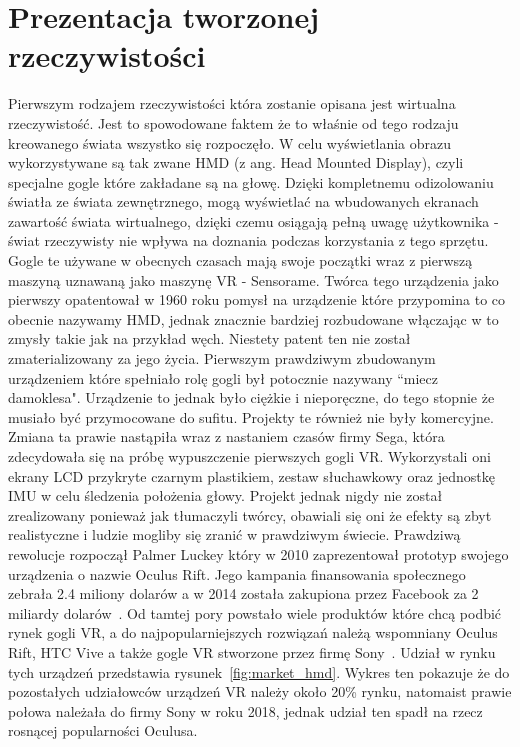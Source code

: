 \section{Prezentacja tworzonej rzeczywistości}
\label{sec:okulary}
	Pierwszym rodzajem rzeczywistości która zostanie opisana jest wirtualna rzeczywistość. Jest to spowodowane faktem że to właśnie od tego rodzaju kreowanego świata wszystko się rozpoczęło. W celu wyświetlania obrazu wykorzystywane są tak zwane HMD (z ang. Head Mounted Display), czyli specjalne gogle które zakładane są na głowę. Dzięki kompletnemu odizolowaniu światła ze świata zewnętrznego, mogą wyświetlać na wbudowanych ekranach zawartość świata wirtualnego, dzięki czemu osiągają pełną uwagę użytkownika - świat rzeczywisty nie wpływa na doznania podczas korzystania z tego sprzętu. Gogle te używane w obecnych czasach mają swoje początki wraz z pierwszą maszyną uznawaną jako maszynę VR - Sensorame. Twórca tego urządzenia jako pierwszy opatentował w 1960 roku pomysł na urządzenie które przypomina to co obecnie nazywamy HMD, jednak znacznie bardziej rozbudowane włączając w to zmysły takie jak na przykład węch. Niestety patent ten nie został zmaterializowany za jego życia. Pierwszym prawdziwym zbudowanym urządzeniem które spełniało rolę gogli był potocznie nazywany ``miecz damoklesa". Urządzenie to jednak było ciężkie i nieporęczne, do tego stopnie że musiało być przymocowane do sufitu. Projekty te również nie były komercyjne. Zmiana ta prawie nastąpiła wraz z nastaniem czasów firmy Sega, która zdecydowała się na próbę wypuszczenie pierwszych gogli VR. Wykorzystali oni ekrany LCD przykryte czarnym plastikiem, zestaw słuchawkowy oraz jednostkę IMU w celu śledzenia położenia głowy. Projekt jednak nigdy nie został zrealizowany ponieważ jak tłumaczyli twórcy, obawiali się oni że efekty są zbyt realistyczne i ludzie mogliby się zranić w prawdziwym świecie. Prawdziwą rewolucje rozpoczął Palmer Luckey który w 2010 zaprezentował prototyp swojego urządzenia o nazwie Oculus Rift. Jego kampania finansowania społecznego zebrała 2.4 miliony dolarów a w 2014 została zakupiona przez Facebook za 2 miliardy dolarów~\cite{hd1}. Od tamtej pory powstało wiele produktów które chcą podbić rynek gogli VR, a do najpopularniejszych rozwiązań należą wspomniany Oculus Rift, HTC Vive a także gogle VR stworzone przez firmę Sony~\cite{hd2}. Udział w rynku tych urządzeń przedstawia rysunek~\ref{fig:market_hmd}. Wykres ten pokazuje że do pozostałych udziałowców urządzeń VR należy około 20\% rynku, natomaist prawie połowa należała do firmy Sony w roku 2018, jednak udział ten spadł na rzecz rosnącej popularności Oculusa. 
